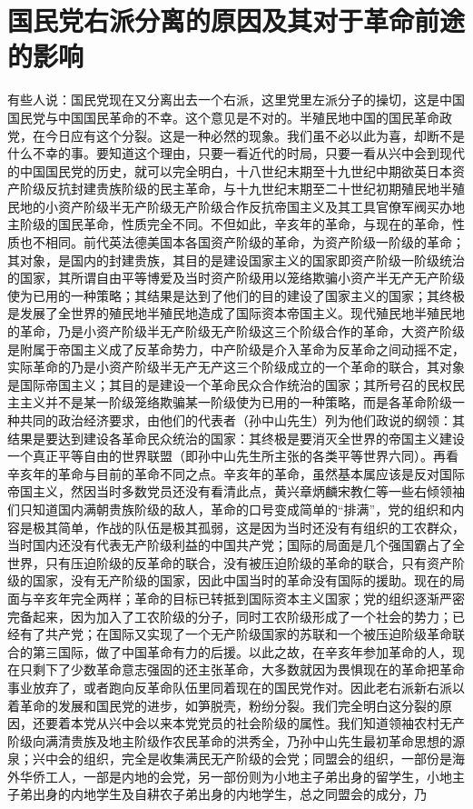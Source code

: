 \section[国民党右派分离的原因及其对于革命前途的影响（一九二六年一月）]{国民党右派分离的原因及其对于革命前途的影响}


有些人说：国民党现在又分离出去一个右派，这里党里左派分子的操切，这是中国国民党与中国国民革命的不幸。这个意见是不对的。半殖民地中国的国民革命政党，在今日应有这个分裂。这是一种必然的现象。我们虽不必以此为喜，却断不是什么不幸的事。要知道这个理由，只要一看近代的时局，只要一看从兴中会到现代的中国国民党的历史，就可以完全明白，十八世纪末期至十九世纪中期欲英日本资产阶级反抗封建贵族阶级的民主革命，与十九世纪末期至二十世纪初期殖民地半殖民地的小资产阶级半无产阶级无产阶级合作反抗帝国主义及其工具官僚军阀买办地主阶级的国民革命，性质完全不同。不但如此，辛亥年的革命，与现在的革命，性质也不相同。前代英法德美国本各国资产阶级的革命，为资产阶级一阶级的革命；其对象，是国内的封建贵族，其目的是建设国家主义的国家即资产阶级一阶级统治的国家，其所谓自由平等博爱及当时资产阶级用以笼络欺骗小资产半无产无产阶级使为已用的一种策略；其结果是达到了他们的目的建设了国家主义的国家；其终极是发展了全世界的殖民地半殖民地造成了国际资本帝国主义。现代殖民地半殖民地的革命，乃是小资产阶级半无产阶级无产阶级这三个阶级合作的革命，大资产阶级是附属于帝国主义成了反革命势力，中产阶级是介入革命为反革命之间动摇不定，实际革命的乃是小资产阶级半无产无产这三个阶级成立的一个革命的联合，其对象是国际帝国主义；其目的是建设一个革命民众合作统治的国家；其所号召的民权民主主义并不是某一阶级笼络欺骗某一阶级使为已用的一种策略，而是各革命阶级一种共同的政治经济要求，由他们的代表者（孙中山先生）列为他们政说的纲领：其结果是要达到建设各革命民众统治的国家：其终极是要消灭全世界的帝国主义建设一个真正平等自由的世界联盟（即孙中山先生所主张的各类平等世界六同）。再看辛亥年的革命与目前的革命不同之点。辛亥年的革命，虽然基本属应该是反对国际帝国主义，然因当时多数党员还没有看清此点，黄兴章炳麟宋教仁等一些右倾领袖们只知道国内满朝贵族阶级的敌人，革命的口号变成简单的“排满”，党的组织和内容是极其简单，作战的队伍是极其孤弱，这是因为当时还没有有组织的工农群众，当时国内还没有代表无产阶级利益的中国共产党；国际的局面是几个强国霸占了全世界，只有压迫阶级的反革命的联合，没有被压迫阶级的革命的联合，只有资产阶级的国家，没有无产阶级的国家，因此中国当时的革命没有国际的援助。现在的局面与辛亥年完全两样；革命的目标已转抵到国际资本主义国家；党的组织逐渐严密完备起来，因为加入了工农阶级的分子，同时工农阶级形成了一个社会的势力；已经有了共产党；在国际又实现了一个无产阶级国家的苏联和一个被压迫阶级革命联合的第三国际，做了中国革命有力的后援。以此之故，在辛亥年参加革命的人，现在只剩下了少数革命意志强固的还主张革命，大多数就因为畏惧现在的革命把革命事业放弃了，或者跑向反革命队伍里同着现在的国民党作对。因此老右派新右派以着革命的发展和国民党的进步，如笋脱壳，粉纷分裂。我们完全明白这分裂的原因，还要着本党从兴中会以来本党党员的社会阶级的属性。我们知道领袖农村无产阶级向满清贵族及地主阶级作农民革命的洪秀全，乃孙中山先生最初革命思想的源泉；兴中会的组织，完全是收集满民无产阶级的会党；同盟会的组织，一部份是海外华侨工人，一部是内地的会党，另一部份则为小地主子弟出身的留学生，小地主子弟出身的内地学生及自耕农子弟出身的内地学生，总之同盟会的成分，乃